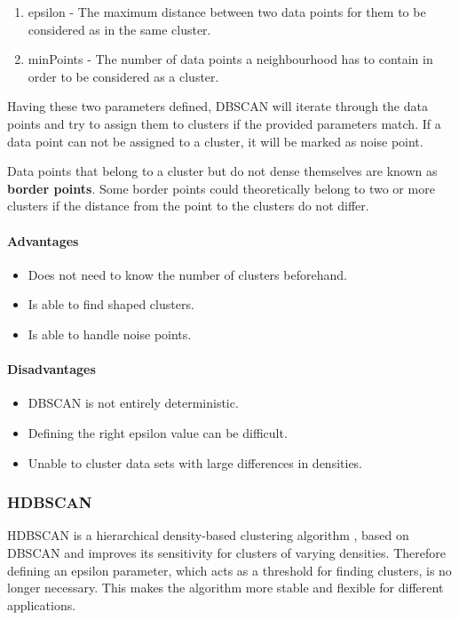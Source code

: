 \begin{enumerate}
    \item epsilon - The maximum distance between two data points for them to be considered as in the same cluster.
    \item minPoints - The number of data points a neighbourhood has to contain in order to be considered as a cluster.
\end{enumerate}

Having these two parameters defined, DBSCAN will iterate through the data points
and try to assign them to clusters if the provided parameters match.
If a data point can not be assigned to a cluster, it will be marked as noise point.

Data points that belong to a cluster but do not dense themselves are known as \textbf{border points}.
Some border points could theoretically belong to two or more clusters
if the distance from the point to the clusters do not differ.

\paragraph{Advantages}
\begin{itemize}
    \item Does not need to know the number of clusters beforehand.
    \item Is able to find shaped clusters.
    \item Is able to handle noise points.
\end{itemize}

\paragraph{Disadvantages}
\begin{itemize}
    \item DBSCAN is not entirely deterministic.
    \item Defining the right epsilon value can be difficult.
    \item Unable to cluster data sets with large differences in densities.
\end{itemize}

\subsubsection{HDBSCAN}

HDBSCAN is a hierarchical density-based clustering algorithm \cite{McInnes2017},
based on DBSCAN and improves its sensitivity for clusters of varying densities.
Therefore defining an epsilon parameter, which acts as a threshold for finding clusters, is no longer necessary.
This makes the algorithm more stable and flexible for different applications.

